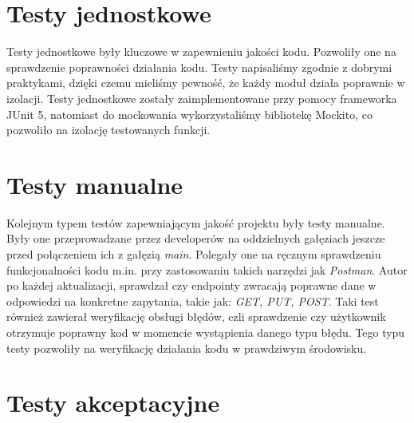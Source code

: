 \section{Testy jednostkowe}
Testy jednostkowe były kluczowe w zapewnieniu jakości kodu. Pozwoliły one na sprawdzenie poprawności działania kodu. Testy napisaliśmy zgodnie z dobrymi praktykami, dzięki czemu mieliśmy pewność, że każdy moduł działa poprawnie w izolacji. Testy jednostkowe zostały zaimplementowane przy pomocy frameworka JUnit 5, natomiast do mockowania wykorzystaliśmy bibliotekę Mockito, co pozwoliło na izolację testowanych funkcji.

\section{Testy manualne}
Kolejnym typem testów zapewniającym jakość projektu były testy manualne. Były one przeprowadzane przez developerów na oddzielnych gałęziach jeszcze przed połączeniem ich z gałęzią \emph{main}. Polegały one na ręcznym sprawdzeniu funkcjonalności kodu m.in. przy zastosowaniu takich narzędzi jak \emph{Postman}.
Autor po każdej aktualizacji, sprawdzał czy endpointy zwracają poprawne dane w odpowiedzi na konkretne zapytania, takie jak: \emph{GET, PUT, POST}. Taki test również zawierał weryfikację obsługi błędów, czli sprawdzenie czy użytkownik otrzymuje poprawny kod w momencie wystąpienia danego typu błędu. Tego typu testy pozwoliły
na weryfikację działania kodu w prawdziwym środowisku.

\section{Testy akceptacyjne}